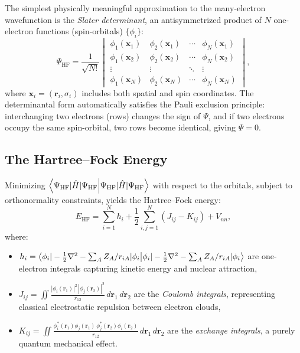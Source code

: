 \documentclass[11pt]{article}
\numberwithin{equation}{section}
\begin{document}
The simplest physically meaningful approximation to the many-electron wavefunction is the \emph{Slater determinant}, an antisymmetrized product of $N$ one-electron functions (spin-orbitals) $\{\phi_i\}$:
\begin{equation}
\Psi_\text{HF} = \frac{1}{\sqrt{N!}}
\begin{vmatrix}
\phi_1(\mathbf{x}_1) & \phi_2(\mathbf{x}_1) & \cdots & \phi_N(\mathbf{x}_1) \\
\phi_1(\mathbf{x}_2) & \phi_2(\mathbf{x}_2) & \cdots & \phi_N(\mathbf{x}_2) \\
\vdots & \vdots & \ddots & \vdots \\
\phi_1(\mathbf{x}_N) & \phi_2(\mathbf{x}_N) & \cdots & \phi_N(\mathbf{x}_N)
\end{vmatrix},
\label{eq:slater}
\end{equation}
where $\mathbf{x}_i = (\mathbf{r}_i, \sigma_i)$ includes both spatial and spin coordinates. The determinantal form automatically satisfies the Pauli exclusion principle: interchanging two electrons (rows) changes the sign of $\Psi$, and if two electrons occupy the same spin-orbital, two rows become identical, giving $\Psi = 0$.

\subsection{The Hartree--Fock Energy}

Minimizing $\braket{\Psi_\text{HF}|\hat{H}|\Psi_\text{HF}}$ with respect to the orbitals, subject to orthonormality constraints, yields the Hartree--Fock energy:
\begin{equation}
E_\text{HF} = \sum_{i=1}^{N} h_i + \frac{1}{2}\sum_{i,j=1}^{N}\left(J_{ij} - K_{ij}\right) + V_{nn},
\label{eq:EHF}
\end{equation}
where:
\begin{itemize}
\item $h_i = \braket{\phi_i|-\tfrac{1}{2}\nabla^2 - \sum_A Z_A/r_{iA}|\phi_i}$ are one-electron integrals capturing kinetic energy and nuclear attraction,
\item $J_{ij} = \iint \frac{|\phi_i(\mathbf{r}_1)|^2\,|\phi_j(\mathbf{r}_2)|^2}{r_{12}}\,d\mathbf{r}_1\,d\mathbf{r}_2$ are the \emph{Coulomb integrals}, representing classical electrostatic repulsion between electron clouds,
\item $K_{ij} = \iint \frac{\phi_i^*(\mathbf{r}_1)\phi_j(\mathbf{r}_1)\,\phi_j^*(\mathbf{r}_2)\phi_i(\mathbf{r}_2)}{r_{12}}\,d\mathbf{r}_1\,d\mathbf{r}_2$ are the \emph{exchange integrals}, a purely quantum mechanical effect.
\end{itemize}
\end{document}
